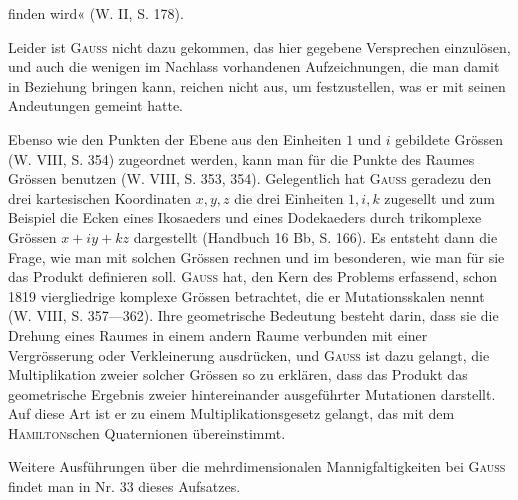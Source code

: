 finden wird« (W. II, S. 178).
\par
Leider ist \textsc{Gauss} nicht dazu gekommen, das hier gegebene Versprechen
einzulösen, und auch die wenigen im Nachlass vorhandenen Aufzeichnungen,
die man damit in Beziehung bringen kann, reichen nicht aus, um festzustellen,
was er mit seinen Andeutungen gemeint hatte.
\par
Ebenso wie den Punkten der Ebene aus den Einheiten \(1\) und \(i\) gebildete
 Grössen (W. VIII, S. 354) zugeordnet werden, kann man für
die Punkte des Raumes  Grössen benutzen (W. VIII, S. 353,
354). Gelegentlich hat \textsc{Gauss} geradezu den drei kartesischen Koordinaten
\(x,y,z\) die drei Einheiten \(1,i,k\) zugesellt und zum Beispiel die Ecken eines
Ikosaeders und eines Dodekaeders durch trikomplexe Grössen \(x+iy+kz\) dargestellt
(Handbuch 16 Bb, S. 166). Es entsteht dann die Frage, wie man mit
solchen Grössen rechnen und im besonderen, wie man für sie das Produkt definieren
soll. \textsc{Gauss} hat, den Kern des Problems erfassend, schon 1819 viergliedrige
komplexe Grössen betrachtet, die er Mutationsskalen nennt (W. VIII,
S. 357—362). Ihre geometrische Bedeutung besteht darin, dass sie die Drehung
eines Raumes in einem andern Raume verbunden mit einer Vergrösserung
oder Verkleinerung ausdrücken, und \textsc{Gauss} ist dazu gelangt, die Multiplikation
zweier solcher Grössen so zu erklären, dass das Produkt das geometrische
Ergebnis zweier hintereinander ausgeführter Mutationen darstellt. Auf diese
Art ist er zu einem Multiplikationsgesetz gelangt, das mit dem \textsc{Hamilton}schen
Quaternionen übereinstimmt.
\par
Weitere Ausführungen über die mehrdimensionalen Mannigfaltigkeiten
bei \textsc{Gauss} findet man in Nr. 33 dieses Aufsatzes.
\clearpage\endgroup
